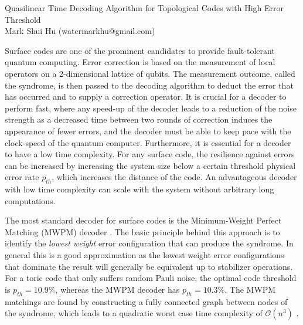 \documentclass[11pt, a4paper, twoside, titlepage, usenames,dvipsnames]{report}
\begin{document}
\begingroup
    \centering
    \Large Quasilinear Time Decoding Algorithm for Topological Codes with High Error Threshold\\[.5em]
    \large Mark Shui Hu (watermarkhu@gmail.com)\\[.5em] \par
\endgroup

Surface codes \cite{dennis2002topological, kitaev2003fault} are one of the prominent candidates to provide fault-tolerant quantum computing. Error correction is based on the measurement of local operators on a 2-dimensional lattice of qubits. The measurement outcome, called the syndrome, is then passed to the decoding algorithm to deduct the error that has occurred and to supply a correction operator. It is crucial for a decoder to perform fast, where any speed-up of the decoder leads to a reduction of the noise strength as a decreased time between two rounds of correction induces the appearance of fewer errors, and the decoder must be able to keep pace with the clock-speed of the quantum computer. Furthermore, it is essential for a decoder to have a low time complexity. For any surface code, the resilience against errors can be increased by increasing the system size below a certain threshold physical error rate $p_{th}$, which increases the distance of the code. An advantageous decoder with low time complexity can scale with the system without arbitrary long computations.

The most standard decoder for surface codes is the Minimum-Weight Perfect Matching (MWPM) decoder \cite{dennis2002topological}. The basic principle behind this approach is to identify the \emph{lowest weight} error configuration that can produce the syndrome. In general this is a good approximation as the lowest weight error configurations that dominate the result will generally be equivalent up to stabilizer operations. For a toric code that only suffers random Pauli noise, the optimal code threshold is $p_{th} = 10.9\%$, whereas the MWPM decoder has $p_{th} = 10.3\%$. The MWPM matchings are found by constructing a fully connected graph between nodes of the syndrome, which leads to a quadratic worst case time complexity of $\mathcal{O}(n^3)$ \cite{kolmogorov2009blossom}.
\end{document}
